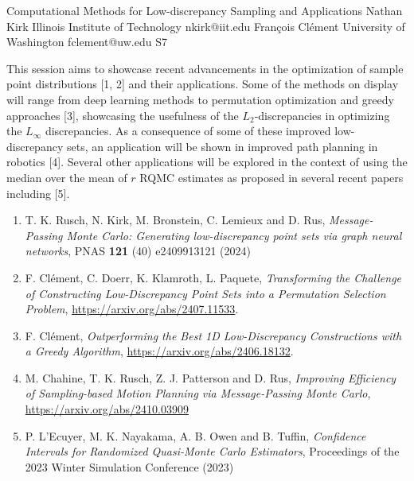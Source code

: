 \documentclass[12pt,lettersize,oneside]{book} %
\begin{document}
\begin{session}
 {Computational Methods for Low-discrepancy Sampling and Applications}%
 {Nathan Kirk}%
 {Illinois Institute of Technology}%
 {nkirk@iit.edu}%
 {Fran\c{c}ois Cl\'ement}%
 {University of Washington}%
 {fclement@uw.edu}%
 {S7}%
{}

 This session aims to showcase recent advancements in the optimization of sample point distributions [1, 2] and their applications. Some of the methods on display will range from deep learning methods to permutation optimization and greedy approaches [3], showcasing the usefulness of the $L_2$-discrepancies in optimizing the $L_{\infty}$ discrepancies. As a consequence of some of these improved low-discrepancy sets, an application will be shown in improved path planning in robotics [4]. Several other applications will be explored in the context of using the median over the mean of $r$ RQMC estimates as proposed in several recent papers including [5].
 \medskip
 \begin{enumerate}
 \item[{[1]}] T. K. Rusch, N. Kirk, M. Bronstein, C. Lemieux and D. Rus, \textit{Message-Passing Monte Carlo: Generating low-discrepancy point sets via graph neural networks}, PNAS \textbf{121} (40) e2409913121 (2024)
 \item[{[2]}] F. Cl\'ement, C. Doerr, K. Klamroth, L. Paquete, \textit{Transforming the Challenge of Constructing Low-Discrepancy Point Sets into a Permutation Selection Problem}, \url{https://arxiv.org/abs/2407.11533}.
 \item[{[3]}] F. Cl\'ement, \textit{Outperforming the Best {1D} Low-Discrepancy Constructions with a Greedy Algorithm}, \url{https://arxiv.org/abs/2406.18132}.
 \item[{[4]}] M. Chahine, T. K. Rusch, Z. J. Patterson and D. Rus, \textit{Improving Efficiency of Sampling-based Motion Planning via Message-Passing Monte Carlo}, \url{https://arxiv.org/abs/2410.03909}
 \item[{[5]}] P. L'Ecuyer, M. K. Nayakama, A. B. Owen and B. Tuffin, \textit{Confidence Intervals for Randomized Quasi-Monte Carlo Estimators}, Proceedings of the 2023 Winter Simulation Conference (2023)
 \end{enumerate}
\end{session}
\end{document}
